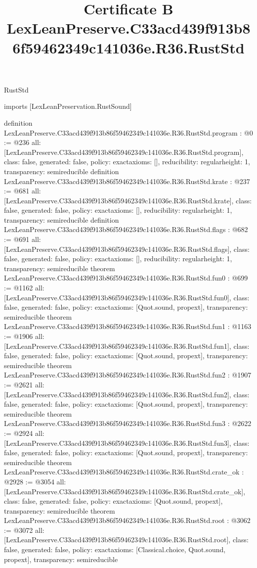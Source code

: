 \begin{lexlean}{RustStd}
\title{Certificate B LexLeanPreserve.C33acd439f913b86f59462349c141036e.R36.RustStd}
\begin{coremodule}
imports [LexLeanPreservation.RustSound]

definition LexLeanPreserve.C33acd439f913b86f59462349c141036e.R36.RustStd.program : @0 := @236 {
  all: [LexLeanPreserve.C33acd439f913b86f59462349c141036e.R36.RustStd.program],
  class: false,
  generated: false,
  policy: exact{axioms: []},
  reducibility: regular{height: 1},
  transparency: semireducible
}
definition LexLeanPreserve.C33acd439f913b86f59462349c141036e.R36.RustStd.krate : @237 := @681 {
  all: [LexLeanPreserve.C33acd439f913b86f59462349c141036e.R36.RustStd.krate],
  class: false,
  generated: false,
  policy: exact{axioms: []},
  reducibility: regular{height: 1},
  transparency: semireducible
}
definition LexLeanPreserve.C33acd439f913b86f59462349c141036e.R36.RustStd.flags : @682 := @691 {
  all: [LexLeanPreserve.C33acd439f913b86f59462349c141036e.R36.RustStd.flags],
  class: false,
  generated: false,
  policy: exact{axioms: []},
  reducibility: regular{height: 1},
  transparency: semireducible
}
theorem LexLeanPreserve.C33acd439f913b86f59462349c141036e.R36.RustStd.fun0 : @699 := @1162 {
  all: [LexLeanPreserve.C33acd439f913b86f59462349c141036e.R36.RustStd.fun0],
  class: false,
  generated: false,
  policy: exact{axioms: [Quot.sound, propext]},
  transparency: semireducible
}
theorem LexLeanPreserve.C33acd439f913b86f59462349c141036e.R36.RustStd.fun1 : @1163 := @1906 {
  all: [LexLeanPreserve.C33acd439f913b86f59462349c141036e.R36.RustStd.fun1],
  class: false,
  generated: false,
  policy: exact{axioms: [Quot.sound, propext]},
  transparency: semireducible
}
theorem LexLeanPreserve.C33acd439f913b86f59462349c141036e.R36.RustStd.fun2 : @1907 := @2621 {
  all: [LexLeanPreserve.C33acd439f913b86f59462349c141036e.R36.RustStd.fun2],
  class: false,
  generated: false,
  policy: exact{axioms: [Quot.sound, propext]},
  transparency: semireducible
}
theorem LexLeanPreserve.C33acd439f913b86f59462349c141036e.R36.RustStd.fun3 : @2622 := @2924 {
  all: [LexLeanPreserve.C33acd439f913b86f59462349c141036e.R36.RustStd.fun3],
  class: false,
  generated: false,
  policy: exact{axioms: [Quot.sound, propext]},
  transparency: semireducible
}
theorem LexLeanPreserve.C33acd439f913b86f59462349c141036e.R36.RustStd.crate_ok : @2928 := @3054 {
  all: [LexLeanPreserve.C33acd439f913b86f59462349c141036e.R36.RustStd.crate_ok],
  class: false,
  generated: false,
  policy: exact{axioms: [Quot.sound, propext]},
  transparency: semireducible
}
theorem LexLeanPreserve.C33acd439f913b86f59462349c141036e.R36.RustStd.root : @3062 := @3072 {
  all: [LexLeanPreserve.C33acd439f913b86f59462349c141036e.R36.RustStd.root],
  class: false,
  generated: false,
  policy: exact{axioms: [Classical.choice, Quot.sound, propext]},
  transparency: semireducible
}


\end{coremodule}
\end{lexlean}
